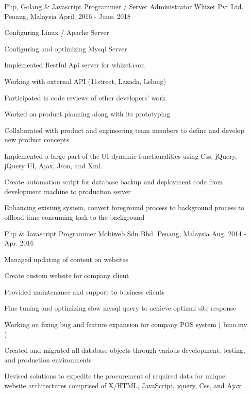 \begin{cventries}
  \cventry
    {Php, Golang \& Javascript Programmer / Server Administrator} %
    {Whizet Pvt Ltd.} %
    {Penang, Malaysia} %
    {April. 2016 - June. 2018} %
    {
      \begin{cvitems} %
      	\item Configuring Linux / Apache Server
        \item Configuring and optimizing Mysql Server
       	\item Implemented Restful Api server for whizet.com
      	\item Working with external API (11street, Lazada, Lelong)
        \item Participated in code reviews of other developers’ work
        \item Worked on product planning along with its prototyping
        \item Collaborated with product and engineering team members to define and develop new product concepts
        \item Implemented a large part of the UI dynamic functionalities using Css, jQuery, jQuery UI, Ajax, Json, and Xml.
        \item Create automation script for database backup and deployment code from development machine to production server
        \item Enhancing existing system, convert foreground process to background process to offload time consuming task to the background
      \end{cvitems}
    }

  \cventry
    {Php \& Javascript Programmer} %
    {Mobiweb Sdn Bhd.} %
    {Penang, Malaysia} %
    {Aug. 2014 - Apr. 2016} %
    {
      \begin{cvitems} %
      	\item Managed updating of content on websites
      	\item Create custom website for company client
        \item Provided maintenance and support to business clients
        \item Fine tuning and optimizing slow mysql query to achieve optimal site response
        \item Working on fixing bug and feature expansion for company POS system ( bmo.my )
        \item Created and migrated all database objects through various development, testing, and production environments
        \item Devised solutions to expedite the procurement of required data for unique website architectures comprised of X/HTML, JavaScript, jquery, Css, and Ajax
      \end{cvitems}
    }


\end{cventries}
